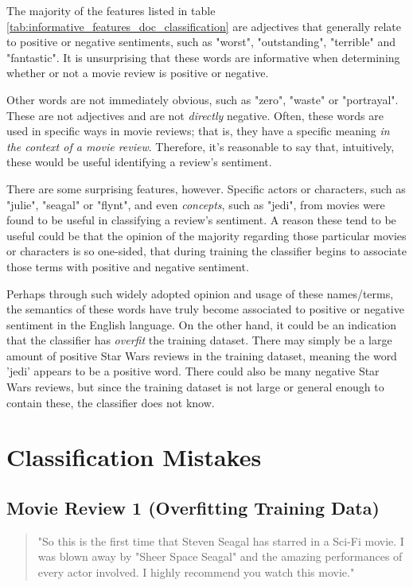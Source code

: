 \documentclass{article}
\begin{document}
The majority of the features listed in table \ref{tab:informative_features_doc_classification} are adjectives that generally relate to positive or negative sentiments, such as "worst", "outstanding", "terrible" and "fantastic". It is unsurprising that these words are informative when determining whether or not a movie review is positive or negative.

Other words are not immediately obvious, such as "zero", "waste" or "portrayal". These are not adjectives and are not \textit{directly} negative. Often, these words are used in specific ways in movie reviews; that is, they have a specific meaning \textit{in the context of a movie review}. Therefore, it's reasonable to say that, intuitively, these would be useful identifying a review's sentiment.

There are some surprising features, however. Specific actors or characters, such as "julie", "seagal" or "flynt", and even \textit{concepts}, such as "jedi", from movies were found to be useful in classifying a review's sentiment. A reason these tend to be useful could be that the opinion of the majority regarding those particular movies or characters is so one-sided, that during training the classifier begins to associate those terms with positive and negative sentiment.

Perhaps through such widely adopted opinion and usage of these names/terms, the semantics of these words have truly become associated to positive or negative sentiment in the English language. On the other hand, it could be an indication that the classifier has \textit{overfit} the training dataset. There may simply be a large amount of positive Star Wars reviews in the training dataset, meaning the word 'jedi' appears to be a positive word. There could also be many negative Star Wars reviews, but since the training dataset is not large or general enough to contain these, the classifier does not know.

\section {Classification Mistakes}

\subsection{Movie Review 1 (Overfitting Training Data)}

\begin{quote}
"So this is the first time that Steven Seagal has starred in a Sci-Fi movie. I was blown away by "Sheer Space Seagal" and the amazing performances of every actor involved. I highly recommend you watch this movie."
\end{quote}
\end{document}
